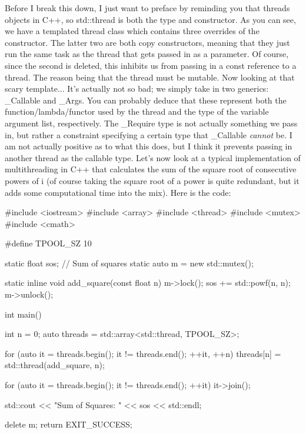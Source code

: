 \documentclass{article}
\begin{document}
Before I break this down, I just want to preface by reminding you that threads objects in C++, so
std::thread is both the type and constructor. As you can see, we have a templated thread class which contains
three overrides of the constructor. The latter two are both copy constructors, meaning that they just run the
same task as the thread that gets passed in as a parameter. Of course, since the second is deleted, this
inhibits us from passing in a const reference to a thread. The reason being that the thread must be mutable.
Now looking at that scary template... It’s actually not so bad; we simply take in two generics: \_Callable
and \_Args. You can probably deduce that these represent both the function/lambda/functor used by the thread
and the type of the variable argument list, respectively. The \_Require type is not actually something we pass
in, but rather a constraint specifying a certain type that \_Callable \textit{cannot} be. I am not actually
positive as to what this does, but I think it prevents passing in another thread as the callable type. Let's
now look at a typical implementation of multithreading in C++ that calculates the sum of the square root of
consecutive powers of i (of course taking the square root of a power is quite redundant, but it adds some
computational time into the mix). Here is the code:

\begin{cpplst}

#include <iostream>
#include <array>
#include <thread>
#include <mutex>
#include <cmath>

#define TPOOL_SZ 10

static float sos; // Sum of squares
static auto m = new std::mutex();

static inline void add_square(const float n)
{
    m->lock();
    sos += std::powf(n, n);
    m->unlock();
}

int main()
{
    int n = 0;
    auto threads = std::array<std::thread, TPOOL_SZ>{};

    for (auto it = threads.begin(); it != threads.end(); ++it, ++n)
    {
        threads[n] = std::thread(add_square, n);
    }

    for (auto it = threads.begin(); it != threads.end(); ++it)
    {
        it->join();
    }

    std::cout << "Sum of Squares: " << sos << std::endl;

    delete m;
    return EXIT_SUCCESS;
}

\end{cpplst}
\end{document}
